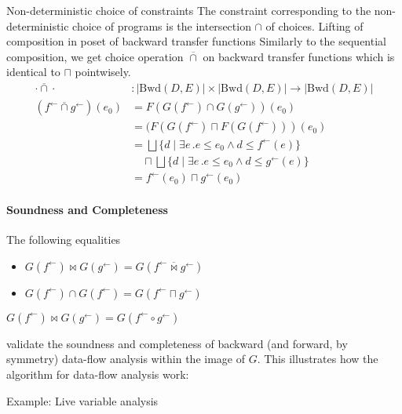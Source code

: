 \documentclass{llncs}
\newcommand{\Unidir}{\mathrm{Bwd}}
\newcommand{\fb}{{f^{\leftarrow}}}
\newcommand{\gb}{{g^{\leftarrow}}}
\newcommand{\bigjoin}{\bigsqcup}
\newcommand{\meet}{\sqcap}
\newcommand{\comp}{\circ}
\newcommand{\bowtielift}{\mathbin{\overline{\bowtie}}}
\newcommand{\caplift}{\mathbin{\overline{\cap}}}
\begin{document}
  Non-deterministic choice of constraints
    The constraint corresponding to the non-deterministic choice of programs is the intersection $\cap$ of choices.
 Lifting of composition in poset of backward transfer functions
    Similarly to the sequential composition, we get choice operation $\caplift$ on backward transfer functions which is identical to $\meet$ pointwisely.
    \begin{align*}
      \cdot \caplift \cdot &: \left| \Unidir(D , E) \right| \times  \left| \Unidir(D, E) \right| \to \left| \Unidir(D, E) \right| \\
      (\fb \caplift \gb) (e_{0})
      &= F(G(\fb) \cap G(\gb)) (e_{0}) \\
      &= (F(G(\fb) \meet F(G(\fb))) (e_{0}) \\
      &= \bigjoin \{ d \mid \exists e\,. e \leq e_{0} \land d \leq \fb(e) \} \\ &\quad \meet \bigjoin \{ d \mid \exists e\,. e \leq e_{0} \land d \leq \gb(e) \} \\
      &= \fb(e_{0}) \meet \gb(e_{0})
    \end{align*}


  \paragraph{Soundness and Completeness}
  The following equalities
  \begin{itemize}
    \item $G(\fb) \bowtie G(\gb) = G(\fb \bowtielift \gb)$
    \item $G(\fb) \cap G(\fb) = G(\fb \meet \gb)$
  \end{itemize}
  \begin{proposition}
    $G(\fb) \bowtie G(\gb) = G(\fb \comp \gb)$
  \end{proposition}
  validate the soundness and completeness of backward (and forward, by symmetry) data-flow analysis within the image of $G$.  This illustrates how the algorithm for data-flow analysis work:


  Example: Live variable analysis
   \begin{center}
  \end{center}
\end{document}
